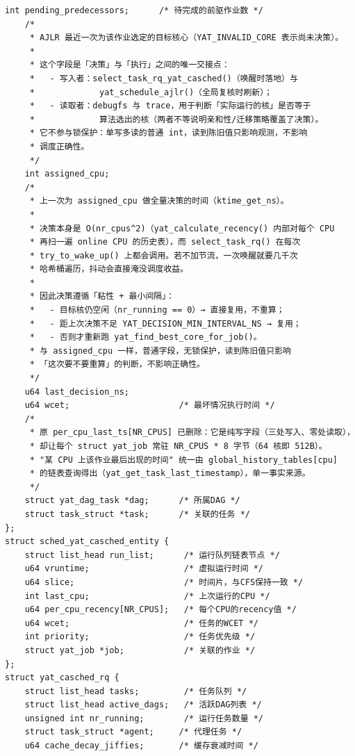 \documentclass[10pt,a4paper]{article}
\newenvironment{yatpage}{\vspace*{0pt}}{\par}
\begin{document}
\begin{yatpage}
\begin{Verbatim}[fontsize=\fontsize{8.2}{9.8}\selectfont]
    int pending_predecessors;      /* 待完成的前驱作业数 */
    /*
     * AJLR 最近一次为该作业选定的目标核心（YAT_INVALID_CORE 表示尚未决策）。
     *
     * 这个字段是「决策」与「执行」之间的唯一交接点：
     *   - 写入者：select_task_rq_yat_casched()（唤醒时落地）与
     *             yat_schedule_ajlr()（全局复核时刷新）；
     *   - 读取者：debugfs 与 trace，用于判断「实际运行的核」是否等于
     *             算法选出的核（两者不等说明亲和性/迁移策略覆盖了决策）。
     * 它不参与锁保护：单写多读的普通 int，读到陈旧值只影响观测，不影响
     * 调度正确性。
     */
    int assigned_cpu;
    /*
     * 上一次为 assigned_cpu 做全量决策的时间（ktime_get_ns）。
     *
     * 决策本身是 O(nr_cpus^2)（yat_calculate_recency() 内部对每个 CPU
     * 再扫一遍 online CPU 的历史表），而 select_task_rq() 在每次
     * try_to_wake_up() 上都会调用。若不加节流，一次唤醒就要几千次
     * 哈希桶遍历，抖动会直接淹没调度收益。
     *
     * 因此决策遵循「粘性 + 最小间隔」：
     *   - 目标核仍空闲（nr_running == 0）→ 直接复用，不重算；
     *   - 距上次决策不足 YAT_DECISION_MIN_INTERVAL_NS → 复用；
     *   - 否则才重新跑 yat_find_best_core_for_job()。
     * 与 assigned_cpu 一样，普通字段，无锁保护，读到陈旧值只影响
     * 「这次要不要重算」的判断，不影响正确性。
     */
    u64 last_decision_ns;
    u64 wcet;                      /* 最坏情况执行时间 */
    /*
     * 原 per_cpu_last_ts[NR_CPUS] 已删除：它是纯写字段（三处写入、零处读取），
     * 却让每个 struct yat_job 常驻 NR_CPUS * 8 字节（64 核即 512B）。
     * "某 CPU 上该作业最后出现的时间" 统一由 global_history_tables[cpu]
     * 的链表查询得出（yat_get_task_last_timestamp），单一事实来源。
     */
    struct yat_dag_task *dag;      /* 所属DAG */
    struct task_struct *task;      /* 关联的任务 */
};
struct sched_yat_casched_entity {
    struct list_head run_list;      /* 运行队列链表节点 */
    u64 vruntime;                   /* 虚拟运行时间 */
    u64 slice;                      /* 时间片，与CFS保持一致 */
    int last_cpu;                   /* 上次运行的CPU */
    u64 per_cpu_recency[NR_CPUS];   /* 每个CPU的recency值 */
    u64 wcet;                       /* 任务的WCET */
    int priority;                   /* 任务优先级 */
    struct yat_job *job;            /* 关联的作业 */
};
struct yat_casched_rq {
    struct list_head tasks;         /* 任务队列 */
    struct list_head active_dags;   /* 活跃DAG列表 */
    unsigned int nr_running;        /* 运行任务数量 */
    struct task_struct *agent;     /* 代理任务 */
    u64 cache_decay_jiffies;       /* 缓存衰减时间 */
\end{Verbatim}
\end{yatpage}
\end{document}
